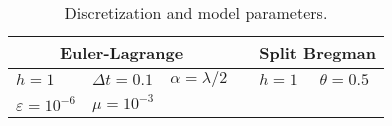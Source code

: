 \begin{table}[htb!]
	\caption[]{Discretization and model parameters.}
	\centering
	\begin{tabular}{lll c ll} \toprule[1.25pt]
		\multicolumn{3}{c}{Euler-Lagrange} & \phantom{abc} & \multicolumn{2}{c}{Split Bregman}
		\\ \midrule
		$h = 1$ & $\Delta t = 0.1$ & $\alpha = \lambda/2$ & & $h = 1$ & $\theta = 0.5$
		\\
		$\varepsilon=10^{-6}$ & $\mu = 10^{-3}$
		\\ \bottomrule[1.25pt]
	\end{tabular}
	\label{tab:model parameters}
\end{table}
















